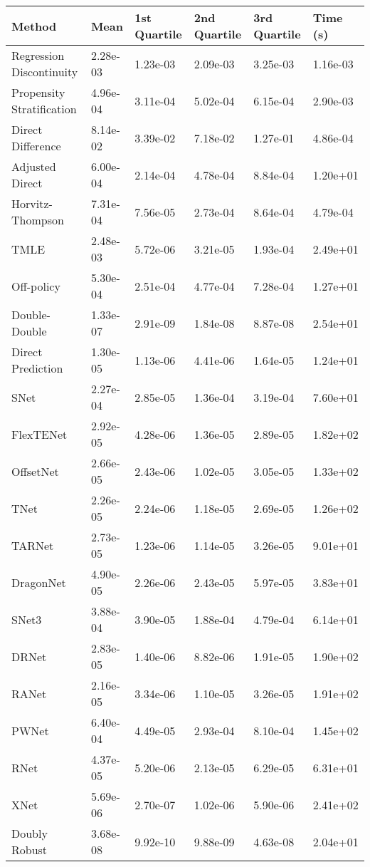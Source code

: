 \begin{tabular}{llllll}
  \toprule
  \textbf{Method} & \textbf{Mean} & \textbf{1st Quartile} & \textbf{2nd Quartile} & \textbf{3rd Quartile} & \textbf{Time (s)} \\ \midrule 
Regression Discontinuity & 2.28e-03 & 1.23e-03 & 2.09e-03 & 3.25e-03 & \cellcolor{bronze!30}1.16e-03\\
Propensity Stratification & 4.96e-04 & 3.11e-04 & 5.02e-04 & 6.15e-04 & 2.90e-03\\
Direct Difference & 8.14e-02 & 3.39e-02 & 7.18e-02 & 1.27e-01 & \cellcolor{silver!30}4.86e-04\\
Adjusted Direct & 6.00e-04 & 2.14e-04 & 4.78e-04 & 8.84e-04 & 1.20e+01\\
Horvitz-Thompson & 7.31e-04 & 7.56e-05 & 2.73e-04 & 8.64e-04 & \cellcolor{gold!30}4.79e-04\\
TMLE & 2.48e-03 & 5.72e-06 & 3.21e-05 & 1.93e-04 & 2.49e+01\\
Off-policy & 5.30e-04 & 2.51e-04 & 4.77e-04 & 7.28e-04 & 1.27e+01\\
Double-Double & \cellcolor{silver!30}1.33e-07 & \cellcolor{silver!30}2.91e-09 & \cellcolor{silver!30}1.84e-08 & \cellcolor{silver!30}8.87e-08 & 2.54e+01\\
Direct Prediction & 1.30e-05 & 1.13e-06 & 4.41e-06 & 1.64e-05 & 1.24e+01\\
SNet & 2.27e-04 & 2.85e-05 & 1.36e-04 & 3.19e-04 & 7.60e+01\\
FlexTENet & 2.92e-05 & 4.28e-06 & 1.36e-05 & 2.89e-05 & 1.82e+02\\
OffsetNet & 2.66e-05 & 2.43e-06 & 1.02e-05 & 3.05e-05 & 1.33e+02\\
TNet & 2.26e-05 & 2.24e-06 & 1.18e-05 & 2.69e-05 & 1.26e+02\\
TARNet & 2.73e-05 & 1.23e-06 & 1.14e-05 & 3.26e-05 & 9.01e+01\\
DragonNet & 4.90e-05 & 2.26e-06 & 2.43e-05 & 5.97e-05 & 3.83e+01\\
SNet3 & 3.88e-04 & 3.90e-05 & 1.88e-04 & 4.79e-04 & 6.14e+01\\
DRNet & 2.83e-05 & 1.40e-06 & 8.82e-06 & 1.91e-05 & 1.90e+02\\
RANet & 2.16e-05 & 3.34e-06 & 1.10e-05 & 3.26e-05 & 1.91e+02\\
PWNet & 6.40e-04 & 4.49e-05 & 2.93e-04 & 8.10e-04 & 1.45e+02\\
RNet & 4.37e-05 & 5.20e-06 & 2.13e-05 & 6.29e-05 & 6.31e+01\\
XNet & \cellcolor{bronze!30}5.69e-06 & \cellcolor{bronze!30}2.70e-07 & \cellcolor{bronze!30}1.02e-06 & \cellcolor{bronze!30}5.90e-06 & 2.41e+02\\
Doubly Robust & \cellcolor{gold!30}3.68e-08 & \cellcolor{gold!30}9.92e-10 & \cellcolor{gold!30}9.88e-09 & \cellcolor{gold!30}4.63e-08 & 2.04e+01\\
\bottomrule
\end{tabular}
